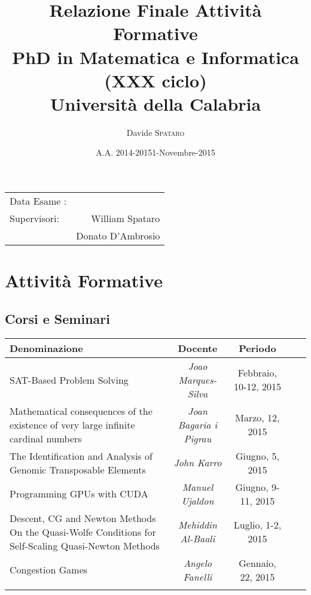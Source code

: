 \documentclass[a4paper]{article}
\begin{document}
\title{Relazione Finale Attività Formative \\ PhD in Matematica e
Informatica (XXX ciclo)\\ Università della Calabria}

\author{Davide \textsc{Spataro}} %

\date{A.A. 2014-2015} %


\maketitle %

\begin{center}
\begin{tabular}{l r}
Data Esame : & \date{1-Novembre-2015} \\
Supervisori: & William Spataro \\ %
& Donato D'Ambrosio \\
\end{tabular}
\end{center}


\section{Attività Formative}


\subsection{Corsi e Seminari}




	\begin{tabularx}{\textwidth}{@{} Y c c c c @{}} %
	\toprule
	\textbf{Denominazione} & \textbf{Docente} & \textbf{Periodo}  \\
	\midrule  \midrule
	 
	 SAT-Based Problem Solving & \textit{Joao Marques-Silva} &  Febbraio, 10-12,
	 2015 \\
	 \addlinespace \midrule 
	  Mathematical consequences of the existence of very large 
infinite cardinal numbers & \textit{Joan Bagaria i Pigrau} &  Marzo, 12,
	 2015	 \\
	 \addlinespace \midrule \addlinespace The Identification and Analysis of
	 Genomic Transposable Elements & \textit{John Karro} & Giugno, 5, 2015 \\ 
	 \addlinespace \midrule Programming GPUs with CUDA & \textit{Manuel Ujaldon} &
	 Giugno, 9-11, 2015 \\ \addlinespace \midrule Descent, CG and Newton Methods
	On the Quasi-Wolfe Conditions 
	for Self-Scaling Quasi-Newton Methods  & \textit{Mehiddin Al-Baali} &  Luglio,
	1-2, 2015\\ 	 \addlinespace \midrule 
	Congestion Games   & \textit{Angelo Fanelli} &  Gennaio, 22,
	 2015 \\
	 \addlinespace \midrule 
	\bottomrule
	\end{tabularx}
\end{document}
